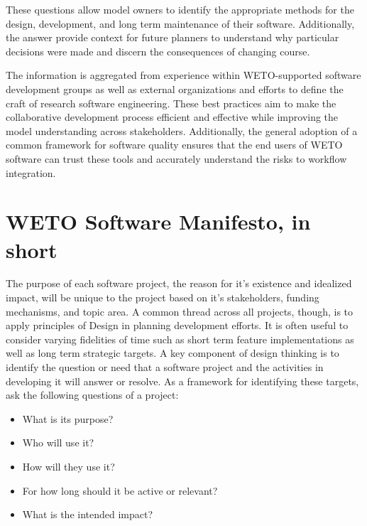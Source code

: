 \documentclass[]{nrel}
\begin{document}
These questions allow model owners to identify the appropriate methods for the design, development,
and long term maintenance of their software. Additionally, the answer provide context for future
planners to understand why particular decisions were made and discern the consequences of
changing course.

The information is aggregated from experience within WETO-supported software development
groups as well as external organizations and efforts to define the craft of research software
engineering. These best practices aim to make the collaborative development process efficient
and effective while improving the model understanding across stakeholders. Additionally,
the general adoption of a common framework for software quality ensures that the end users
of WETO software can trust these tools and accurately understand the risks to workflow integration.


\clearpage
\tableofcontents
\listoffigures

\mainmatter
\pagestyle{fancy}




\chapter{WETO Software Manifesto, in short}
The purpose of each software project, the reason for it’s existence and idealized impact, will
be unique to the project based on it’s stakeholders, funding mechanisms, and topic area.
A common thread across all projects, though, is to apply principles of Design in planning
development efforts.
It is often useful to consider varying fidelities of time such as short term feature
implementations as well as long term strategic targets.
A key component of design thinking is to identify the question or need that a software project
and the activities in developing it will answer or resolve.
As a framework for identifying these targets, ask the following questions of a project:
\begin{itemize}
\item What is its purpose?

\item Who will use it?

\item How will they use it?

\item For how long should it be active or relevant?

\item What is the intended impact?

\end{itemize}
\end{document}
